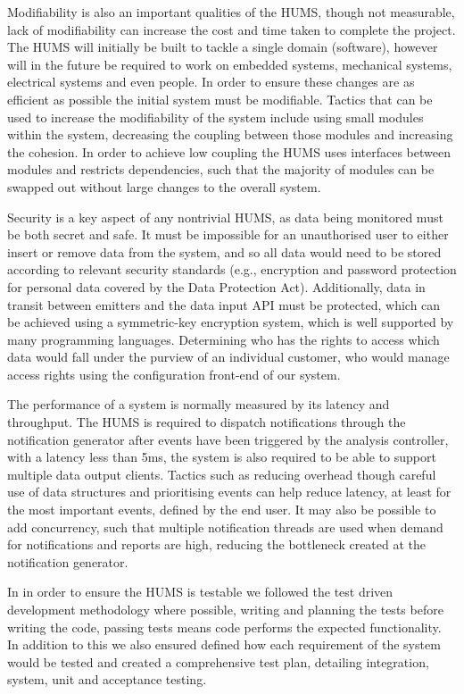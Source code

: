 \documentclass[10pt,a4paper]{article}
\begin{document}
Modifiability is also an important qualities of the HUMS, though not 
measurable, lack of modifiability can increase the cost and time taken to 
complete the project. The HUMS will initially be built to tackle a single 
domain 
(software), however will in the future be required to work on embedded 
systems, mechanical systems, electrical systems and even people. In 
order to 
ensure these changes are as efficient as possible the initial system 
must be modifiable. Tactics that can be used to increase the modifiability 
of the 
system include using small modules within the system, decreasing the 
coupling between those modules and increasing the cohesion. In order 
to 
achieve low coupling  the HUMS uses interfaces between modules and 
restricts dependencies, such that the majority of modules can be 
swapped out 
without large changes to the overall system.

Security is a key aspect of any nontrivial HUMS, as data being monitored must
be both secret and safe. It must be impossible for an unauthorised user to
either insert or remove data from the system, and so all data would need to be
stored according to relevant security standards (e.g., encryption and password
protection for personal data covered by the Data Protection Act). Additionally,
data in transit between emitters and the data input API must be protected,
which can be achieved using a symmetric-key encryption system, which is well
supported by many programming languages. Determining who has the rights to
access which data would fall under the purview of an individual customer, who
would manage access rights using the configuration front-end of our system.

The performance of a system is normally measured by its latency and 
throughput. The HUMS is required to dispatch notifications through the 
notification generator after events have been triggered by the analysis 
controller, with a latency less than 5ms, the system is 
also required to be able to support multiple data output clients. Tactics 
such as 
reducing overhead though careful use of data structures and prioritising 
events 
can help reduce latency, at least for the most important events, defined 
by the 
end user. It may also be possible to add concurrency, such that multiple 
notification threads are used when demand for notifications and reports 
are 
high, reducing the bottleneck created at the notification generator.

In in order to ensure the HUMS is testable we followed the test driven 
development methodology where possible, writing and planning the tests 
before writing the code, passing tests means code performs the 
expected functionality. In addition to this we also ensured defined how 
each requirement of the system would be tested and created a 
comprehensive test plan, detailing integration, system, unit and 
acceptance testing.
\end{document}
